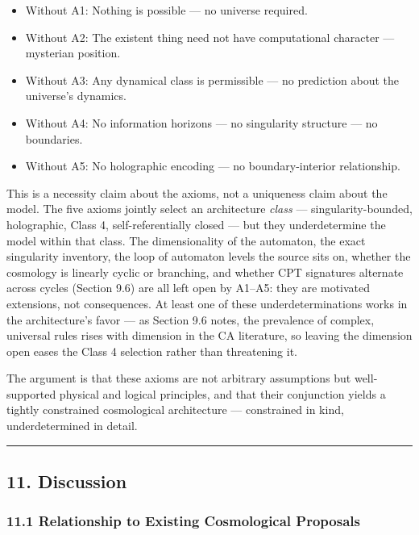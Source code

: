 \documentclass[
]{article}
\providecommand{\tightlist}{%
  \setlength{\itemsep}{0pt}\setlength{\parskip}{0pt}}
\begin{document}
\begin{itemize}
\tightlist
\item
  Without A1: Nothing is possible --- no universe required.
\item
  Without A2: The existent thing need not have computational character
  --- mysterian position.
\item
  Without A3: Any dynamical class is permissible --- no prediction about
  the universe's dynamics.
\item
  Without A4: No information horizons --- no singularity structure ---
  no boundaries.
\item
  Without A5: No holographic encoding --- no boundary-interior
  relationship.
\end{itemize}

This is a necessity claim about the axioms, not a uniqueness claim about
the model. The five axioms jointly select an architecture \emph{class}
--- singularity-bounded, holographic, Class 4, self-referentially closed
--- but they underdetermine the model within that class. The
dimensionality of the automaton, the exact singularity inventory, the
loop of automaton levels the source sits on, whether the cosmology is
linearly cyclic or branching, and whether CPT signatures alternate
across cycles (Section 9.6) are all left open by A1--A5: they are
motivated extensions, not consequences. At least one of these
underdeterminations works in the architecture's favor --- as Section 9.6
notes, the prevalence of complex, universal rules rises with dimension
in the CA literature, so leaving the dimension open eases the Class 4
selection rather than threatening it.

The argument is that these axioms are not arbitrary assumptions but
well-supported physical and logical principles, and that their
conjunction yields a tightly constrained cosmological architecture ---
constrained in kind, underdetermined in detail.

\begin{center}\rule{0.5\linewidth}{0.5pt}\end{center}

\hypertarget{discussion}{%
\subsection{11. Discussion}\label{discussion}}

\hypertarget{relationship-to-existing-cosmological-proposals}{%
\subsubsection{11.1 Relationship to Existing Cosmological
Proposals}\label{relationship-to-existing-cosmological-proposals}}
\end{document}
